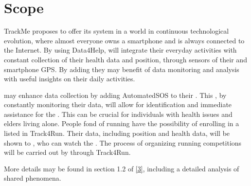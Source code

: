\documentclass[../../DD.tex]{subfiles}
\begin{document}
\section{Scope}
	TrackMe proposes to offer its system in a world in continuous technological evolution, where almost everyone owns a smartphone and is always connected to the Internet.
	By using Data4Help,  will integrate their everyday activities with constant collection of their health data and position, through sensors of their  and smartphone GPS. By adding  they may benefit of data monitoring and analysis with useful insights on their daily activities. 

	 may enhance data collection by adding AutomatedSOS to their . This , by constantly monitoring their data, will allow for identification and immediate assistance for the . This can be crucial for individuals with health issues and elders living alone.
	People fond of running have the possibility of enrolling in a  listed in Track4Run. Their data, including position and health data, will be shown to , who can watch the . The process of organizing running competitions will be carried out by  through Track4Run.

	More details may be found in section 1.2 of  \hyperref[ref:3]{[3]}, including a detailed analysis of shared phenomena.
\end{document}
